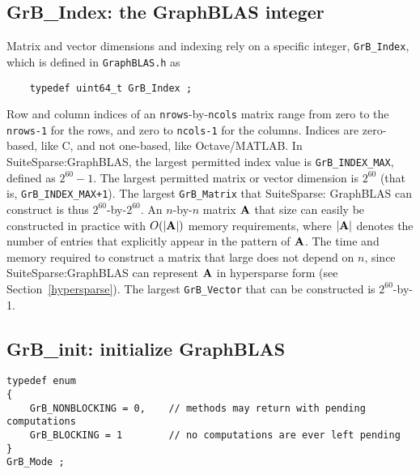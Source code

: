 \documentclass[12pt]{article}
\begin{document}
{%
\subsection{{\sf GrB\_Index:} the GraphBLAS integer} %
\label{grbindex}

Matrix and vector dimensions and indexing rely on a specific integer,
\verb'GrB_Index', which is defined in \verb'GraphBLAS.h' as

    {\footnotesize
    \begin{verbatim}
    typedef uint64_t GrB_Index ; \end{verbatim}}

Row and column indices of an \verb'nrows'-by-\verb'ncols' matrix range from
zero to the \verb'nrows-1' for the rows, and zero to \verb'ncols-1' for the
columns.  Indices are zero-based, like C, and not one-based, like
Octave/MATLAB.  In SuiteSparse:GraphBLAS, the largest permitted index value
is \verb'GrB_INDEX_MAX', defined as $2^{60}-1$.  The largest permitted
matrix or vector dimension is $2^{60}$ (that is, \verb'GrB_INDEX_MAX+1').
The largest \verb'GrB_Matrix' that
SuiteSparse: GraphBLAS can construct is thus $2^{60}$-by-$2^{60}$.  An
$n$-by-$n$ matrix $\bf A$ that size can easily be constructed in practice with
$O(|{\bf A}|)$ memory requirements, where $|{\bf A}|$ denotes the number of
entries that explicitly appear in the pattern of ${\bf A}$.  The time and
memory required to construct a matrix that large does not depend on $n$, since
SuiteSparse:GraphBLAS can represent ${\bf A}$ in hypersparse form (see
Section~\ref{hypersparse}).  The largest \verb'GrB_Vector' that can be
constructed is $2^{60}$-by-1.

\subsection{{\sf GrB\_init:} initialize GraphBLAS} %
\label{init}

\begin{mdframed}[userdefinedwidth=6in]
{\footnotesize
\begin{verbatim}
typedef enum
{
    GrB_NONBLOCKING = 0,    // methods may return with pending computations
    GrB_BLOCKING = 1        // no computations are ever left pending
}
GrB_Mode ;
\end{verbatim}
}\end{mdframed}

}
\end{document}
